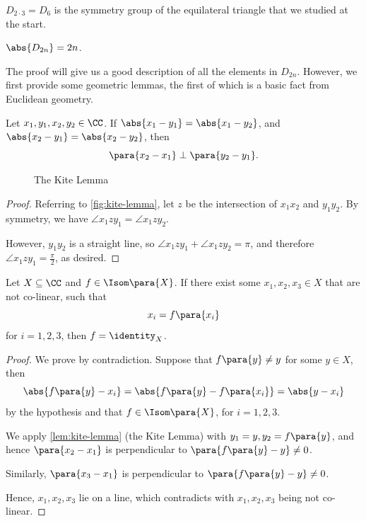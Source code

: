 \begin{example}[\(D_6\)]
    \(D_{2 \cdot 3} = D_6\) is the symmetry group of the equilateral triangle that we studied at the start.
\end{example}

\begin{theorem}
    \label{thm:size-of-dihedral-group}%
    \(\abs{D_{2n}} = 2n\).
\end{theorem}

The proof will give us a good description of all the elements in \(D_{2n}\). However, we first provide some geometric lemmas, the first of which is a basic fact from Euclidean geometry.

\begin{lemma}
    \label{lem:kite-lemma}%
    Let \(x_1, y_1, x_2, y_2 \in \CC\). If \(\abs{x_1 - y_1} = \abs{x_1 - y_2}\), and \(\abs{x_2 - y_1} = \abs{x_2 - y_2}\), then
    \[
        \para{x_2 - x_1} \perp \para{y_2 - y_1}.
    \]
\end{lemma}

\begin{figure}[ht!]
    \centering
    \caption{The Kite Lemma}
    \label{fig:kite-lemma}
\end{figure}

\begin{proof}
    Referring to \autoref{fig:kite-lemma}, let \(z\) be the intersection of \(x_1 x_2\) and \(y_1 y_2\). By symmetry, we have \(\angle x_1 z y_1 = \angle x_1 z y_2\).

    However, \(y_1 y_2\) is a straight line, so \(\angle x_1 z y_1 + \angle x_1 z y_2 = \pi\), and therefore \(\angle x_1 z y_1 = \frac{\pi}{2}\), as desired.
\end{proof}

\begin{lemma}
    \label{lem:three-point-lemma}%
    Let \(X \subseteq \CC\) and \(f \in \Isom\para{X}\). If there exist some \(x_1, x_2, x_3 \in X\) that are not co-linear, such that
    \[
        x_i = f\para{x_i}
    \]
    for \(i = 1, 2, 3\), then \(f = \identity_{X}\).
\end{lemma}

\begin{proof}
    We prove by contradiction. Suppose that \(f\para{y} \neq y\) for some \(y \in X\), then
    \[
        \abs{f\para{y} - x_i} = \abs{f\para{y} - f\para{x_i}} = \abs{y - x_i}
    \]
    by the hypothesis and that \(f \in \Isom\para{X}\), for \(i = 1, 2, 3\).

    We apply \autoref{lem:kite-lemma} (the Kite Lemma) with \(y_1 = y, y_2 = f\para{y}\), and hence \(\para{x_2 - x_1}\) is perpendicular to \(\para{f\para{y} - y} \neq 0\).

    Similarly, \(\para{x_3 - x_1}\) is perpendicular to \(\para{f\para{y} - y} \neq 0\).

    Hence, \(x_1, x_2, x_3\) lie on a line, which contradicts with \(x_1, x_2, x_3\) being not co-linear.
\end{proof}


